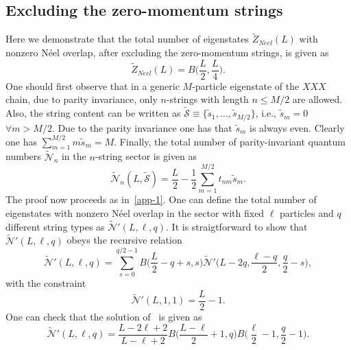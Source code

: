 \documentclass[11pt]{iopart}
\begin{document}
\subsection{Excluding the zero-momentum strings}
\label{app-1.2}

Here we demonstrate that the total number of eigenstates $\widetilde Z_{Neel}(L)$ 
with nonzero N\'eel overlap, after excluding the zero-momentum strings, is given as 
%
\begin{equation}
\label{result}
\widetilde Z_{Neel}(L)=B\Big(\frac{L}{2},\frac{L}{4}\Big). 
\end{equation}
One should first observe that in a generic $M$-particle eigenstate of the $XXX$ chain, 
due to parity invariance, only $n$-strings with length $n\le M/2$ are allowed. Also, the 
string content can be written as $\widetilde{\mathcal S}\equiv\{\tilde s_1,\dots,\tilde 
s_{M/2}\}$, i.e., $\tilde s_m=0$ $\forall m>M/2$. Due to the parity invariance 
one has that $\tilde s_m$ is always even. Clearly one has $\sum_{m=1}^{M/2}m \tilde 
s_m=M$. Finally, the total number of parity-invariant quantum numbers $\widetilde{
\mathcal N}_n$ in the $n$-string sector is given as  
%
\begin{equation}
\widetilde{\mathcal N}_n(L,\widetilde{\mathcal S})=\frac{L}{2}-\frac{1}{2}
\sum_{m=1}^{M/2}t_{nm}\tilde s_m.
\end{equation}
%
The proof now proceeds as in~\ref{app-1}. One can define the total number of eigenstates 
with nonzero N\'eel overlap in the sector with fixed $\ell$ particles and $q$ different 
string types as $\widetilde{\mathcal N}'(L,\ell,q)$. It is straigtforward to show that 
$\widetilde{\mathcal N}'(L,\ell,q)$ obeys the recursive relation
%
\begin{equation}
\label{NpLlq-1}
\widetilde{\mathcal N}'(L,\ell,q)=\sum_{s=0}^{q/2-1}B\Big(\frac{L}{2}-q+s,s\Big)\widetilde
{\mathcal N}'\Big(L-2q,\frac{\ell-q}{2},\frac{q}{2}-s\Big),
\end{equation}
% 
with the constraint
%
\begin{equation}
\widetilde{\mathcal N}'(L,1,1)=\frac{L}{2}-1. 
\end{equation}
%
One can check that the solution of~ is given as 
%
\begin{equation}
\widetilde{\mathcal N}'(L,\ell,q)=\frac{L-2\ell+2}{L-\ell+2}B\Big(\frac{L-\ell}{2}+1,q\Big)
B\Big(\frac{\ell}{2}-1,\frac{q}{2}-1\Big).
\end{equation}
\end{document}
